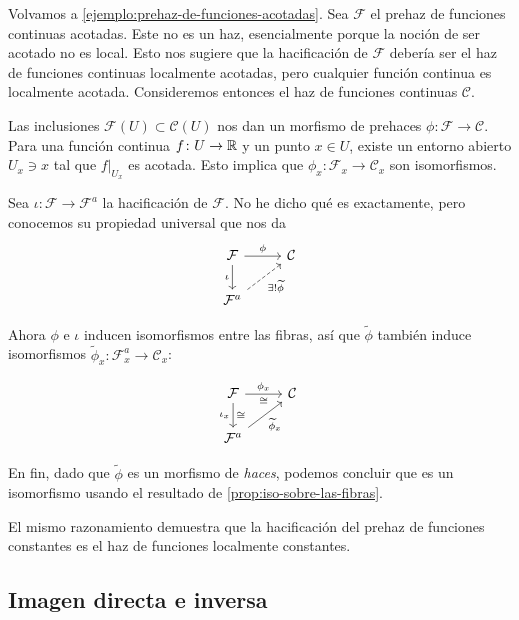 \documentclass{article}
\numberwithin{equation}{section}
\theoremstyle{definition}
\begin{document}
\begin{ejemplo}
  Volvamos a \ref{ejemplo:prehaz-de-funciones-acotadas}. Sea $\mathcal{F}$
  el prehaz de funciones continuas acotadas. Este no es un haz, esencialmente
  porque la noción de ser acotado no es local. Esto nos sugiere que
  la hacificación de $\mathcal{F}$ debería ser el haz de funciones continuas
  localmente acotadas, pero cualquier función continua es localmente
  acotada. Consideremos entonces el haz de funciones continuas $\mathcal{C}$.

  Las inclusiones $\mathcal{F} (U) \subset \mathcal{C} (U)$ nos dan un morfismo
  de prehaces $\phi\colon \mathcal{F} \to \mathcal{C}$. Para una función
  continua $f\colon U\to \mathbb{R}$ y un punto $x \in U$, existe un entorno abierto
  $U_x \ni x$ tal que $\left.f\right|_{U_x}$ es acotada. Esto implica
  que $\phi_x\colon \mathcal{F}_x \to \mathcal{C}_x$ son isomorfismos.

  Sea $\iota\colon \mathcal{F} \to \mathcal{F}^a$ la hacificación
  de $\mathcal{F}$. No he dicho qué es exactamente, pero conocemos su propiedad
  universal que nos da
  \[ \begin{tikzcd}
      \mathcal{F} \ar{r}{\phi}\ar{d}[swap]{\iota} & \mathcal{C} \\
      \mathcal{F}^a\ar[dashed]{ur}[swap]{\exists ! \widetilde{\phi}}
    \end{tikzcd} \]

  Ahora $\phi$ e $\iota$ inducen isomorfismos entre las fibras, así que
  $\widetilde{\phi}$ también induce isomorfismos
  $\widetilde{\phi}_x\colon \mathcal{F}^a_x \to \mathcal{C}_x$:

  \[ \begin{tikzcd}
      \mathcal{F} \ar{r}{\phi_x}[swap]{\isom}\ar{d}{\isom}[swap]{\iota_x} & \mathcal{C} \\
      \mathcal{F}^a\ar{ur}[swap]{\widetilde{\phi}_x}
    \end{tikzcd} \]

  En fin, dado que $\widetilde{\phi}$ es un morfismo de \emph{haces}, podemos
  concluir que es un isomorfismo usando el resultado
  de \ref{prop:iso-sobre-las-fibras}.
\end{ejemplo}

\begin{ejemplo}
  El mismo razonamiento demuestra que la hacificación del prehaz de funciones
  constantes es el haz de funciones localmente constantes.
\end{ejemplo}

\subsection{Imagen directa e inversa}
\end{document}
